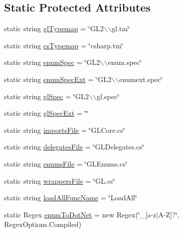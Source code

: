 \subsection*{Static Protected Attributes}
\begin{DoxyCompactItemize}
\item 
static string \hyperlink{class_bind_1_1_g_l2_1_1_generator_ab9d850d5a7f454f18e1493b9532a9f18}{glTypemap} = \char`\"{}GL2$\backslash$$\backslash$gl.tm\char`\"{}
\item 
static string \hyperlink{class_bind_1_1_g_l2_1_1_generator_ab5499e9adc2a5fd054e28a525aa1adbf}{csTypemap} = \char`\"{}csharp.tm\char`\"{}
\item 
static string \hyperlink{class_bind_1_1_g_l2_1_1_generator_a164592b7b73705b19e193171ad8276db}{enumSpec} = \char`\"{}GL2$\backslash$$\backslash$enum.spec\char`\"{}
\item 
static string \hyperlink{class_bind_1_1_g_l2_1_1_generator_ae086b607c7ddba6b89c7e36e7bafc925}{enumSpecExt} = \char`\"{}GL2$\backslash$$\backslash$enumext.spec\char`\"{}
\item 
static string \hyperlink{class_bind_1_1_g_l2_1_1_generator_adf22b77aa7b8045e755c73066fc9e6da}{glSpec} = \char`\"{}GL2$\backslash$$\backslash$gl.spec\char`\"{}
\item 
static string \hyperlink{class_bind_1_1_g_l2_1_1_generator_a445927d580862e53ace5e70040bf6761}{glSpecExt} = \char`\"{}\char`\"{}
\item 
static string \hyperlink{class_bind_1_1_g_l2_1_1_generator_aef567e60258164fbe861f85224516e58}{importsFile} = \char`\"{}GLCore.cs\char`\"{}
\item 
static string \hyperlink{class_bind_1_1_g_l2_1_1_generator_a5b350f970dd33df9ecf5d1c3264fc095}{delegatesFile} = \char`\"{}GLDelegates.cs\char`\"{}
\item 
static string \hyperlink{class_bind_1_1_g_l2_1_1_generator_a081cd925878beb9277482b1a5b5151ae}{enumsFile} = \char`\"{}GLEnums.cs\char`\"{}
\item 
static string \hyperlink{class_bind_1_1_g_l2_1_1_generator_a0bda98500ebdcf4e33497cfee0bedaea}{wrappersFile} = \char`\"{}GL.cs\char`\"{}
\item 
static string \hyperlink{class_bind_1_1_g_l2_1_1_generator_a5a1e4f3c93ada38a8ca45945c8f30e93}{loadAllFuncName} = \char`\"{}LoadAll\char`\"{}
\item 
static Regex \hyperlink{class_bind_1_1_g_l2_1_1_generator_aa936561121a5a76e1cee050e00f2d4a2}{enumToDotNet} = new Regex(\char`\"{}\_\-\mbox{[}a-\/z$|$A-\/Z\mbox{]}?\char`\"{}, RegexOptions.Compiled)
\end{DoxyCompactItemize}


